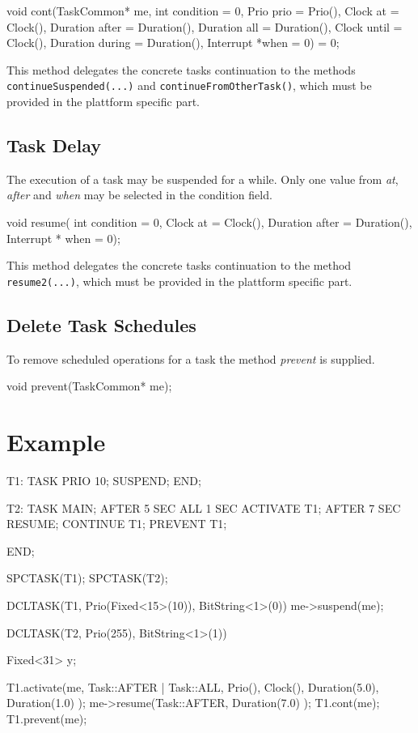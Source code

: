 \begin{CppCode}
void cont(TaskCommon* me,
          int condition = 0,
          Prio prio = Prio(),
          Clock at = Clock(),
          Duration after = Duration(),
          Duration all = Duration(),
          Clock until = Clock(),
          Duration during = Duration(),
          Interrupt *when = 0) = 0;
\end{CppCode}

This method delegates the concrete tasks continuation to the methods
\verb|continueSuspended(...)| and \verb|continueFromOtherTask()|,
which must be provided in the plattform specific part.

\subsection{Task Delay}
The execution of a task may be suspended for a while.
Only one value from {\em at}, {\em after} and {\em when} may be selected
in the condition field. 


\begin{CppCode}
void resume( int condition = 0,
             Clock at = Clock(),
             Duration after = Duration(),
             Interrupt * when = 0);
\end{CppCode}
This method delegates the concrete tasks continuation to the method
\verb|resume2(...)|,
which must be provided in the plattform specific part.


\subsection{Delete Task Schedules}
To remove scheduled operations for a task the method {\em prevent} is supplied.

\begin{CppCode}
void prevent(TaskCommon* me);
\end{CppCode}

\section{Example}
\begin{PEARLCode}
T1: TASK PRIO 10;
   SUSPEND;
END;

T2: TASK MAIN;
   AFTER 5 SEC ALL 1 SEC ACTIVATE T1;
   AFTER 7 SEC RESUME;
   CONTINUE T1;
   PREVENT T1;
   
END;
\end{PEARLCode}

\begin{CppCode}
SPCTASK(T1);
SPCTASK(T2);

DCLTASK(T1, Prio(Fixed<15>(10)), BitString<1>(0)) {
  me->suspend(me);
}

DCLTASK(T2, Prio(255), BitString<1>(1)) {
  Fixed<31> y;

  T1.activate(me,
              Task::AFTER | Task::ALL,
              Prio(),
              Clock(),
              Duration(5.0),
              Duration(1.0) );
  me->resume(Task::AFTER, Duration(7.0) );
  T1.cont(me);
  T1.prevent(me);
}

\end{CppCode}

